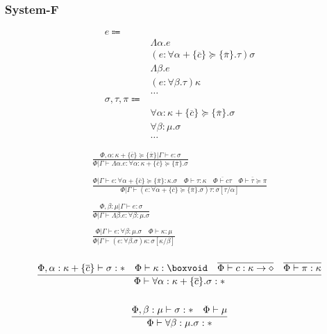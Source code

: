 \documentclass {article}
\begin{document}
\subsubsection{System-F}
\begin{align*}
e \Coloneqq & \\
& \Lambda \alpha. e \tag{Type Lambda} \\
& (e : \forall \alpha + \{ \overline c \} \succeq \{ \overline \pi \}. \tau) \sigma \tag{Type Application} \\
& \Lambda \beta. e \tag{Kind Lambda} \\
& (e : \forall \beta. \tau) \kappa \tag{Kind Application} \\
& \dots \\
\sigma, \tau, \pi \Coloneqq & \\
& \forall \alpha : \kappa + \{ \overline c \} \succeq \{ \overline \pi \}. \sigma \tag{Type Poly}\\ 
& \forall \beta : \mu. \sigma \tag{Kind Poly}\\
& \dots
\end{align*}

\begin{gather*}
\frac
{\Phi, \alpha : \kappa + \{ \overline c \} \succeq \{ \overline \pi \} | \Gamma \vdash e : \sigma}
{\Phi | \Gamma \vdash \Lambda \alpha. e : \forall \alpha : \kappa + \{ \overline c\} \succeq \{ \overline \pi \} . \sigma } \\
\\
\frac
{\Phi | \Gamma \vdash e : \forall \alpha + \{ \overline c \} \succeq \{ \overline \pi \} : \kappa. \sigma \quad \Phi \vdash \tau : \kappa \quad \overline {\Phi \vdash c \tau} \quad \overline { \Phi \vdash \tau \succeq \pi }}
{\Phi | \Gamma \vdash (e : \forall \alpha + \{ \overline c \} \succeq \{ \overline \pi \}. \sigma) \tau : \sigma [\tau/\alpha] } \\
\\
\frac
{\Phi, \beta : \mu | \Gamma \vdash e : \sigma}
{\Phi | \Gamma \vdash \Lambda \beta. e : \forall \beta : \mu. \sigma} \\
\\
\frac
{\Phi | \Gamma \vdash e : \forall \beta : \mu. \sigma \quad \Phi \vdash \kappa : \mu}
{\Phi | \Gamma \vdash (e : \forall \beta. \sigma) \kappa : \sigma [\kappa/\beta]} \\
\end{gather*}

\begin{gather*}
\frac
{\Phi, \alpha : \kappa + \{ \overline c \} \vdash \sigma : * \quad \Phi \vdash \kappa : \boxvoid \quad \overline { \Phi \vdash c : \kappa \to \diamond} \quad \overline { \Phi \vdash \pi : \kappa }}
{\Phi \vdash \forall \alpha : \kappa + \{ \overline c \}. \sigma : * } \\
\\
\frac
{\Phi, \beta : \mu \vdash \sigma : * \quad \Phi \vdash \mu}
{\Phi \vdash \forall \beta : \mu. \sigma : * } \\
\end{gather*}
\end{document}
